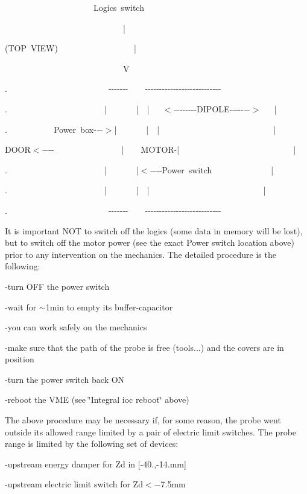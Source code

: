 \begin{lyxcode}
~~~~~~~~~~~~~~~~~~~~~Logics~switch~

~~~~~~~~~~~~~~~~~~~~~~~~~~~~|~

(TOP~VIEW)~~~~~~~~~~~~~~~~~~|~

~~~~~~~~~~~~~~~~~~~~~~~~~~~~V~~

.~~~~~~~~~~~~~~~~~~~~~~~~-{}-{}-{}-{}-{}-{}-~~~~-{}-{}-{}-{}-{}-{}-{}-{}-{}-{}-{}-{}-{}-{}-{}-{}-{}-{}-{}-{}-{}-{}-{}-{}-{}-{}-~

.~~~~~~~~~~~~~~~~~~~~~~~|~~~~~~~|~~|~~~$< -${}-{}-{}-{}-{}-{}-DIPOLE-{}-{}-{}-{}-{}$->$~~~|~

.~~~~~~~~~~~Power~box-{}$->$|~~~~~~~|~~|~~~~~~~~~~~~~~~~~~~~~~~~~~~|~

DOOR$< -${}-{}-~~~~~~~~~~~~~~~~|~~~~MOTOR-|~~~~~~~~~~~~~~~~~~~~~~~~~~~|~

.~~~~~~~~~~~~~~~~~~~~~~~|~~~~~~~|$< -${}-{}-Power~switch~~~~~~~~~~~~~~|~

.~~~~~~~~~~~~~~~~~~~~~~~|~~~~~~~|~~|~~~~~~~~~~~~~~~~~~~~~~~~~~~|~

.~~~~~~~~~~~~~~~~~~~~~~~~-{}-{}-{}-{}-{}-{}-~~~~-{}-{}-{}-{}-{}-{}-{}-{}-{}-{}-{}-{}-{}-{}-{}-{}-{}-{}-{}-{}-{}-{}-{}-{}-{}-{}-~
\end{lyxcode}


It is important NOT to switch off the logics (some data in memory will be lost),
but to switch off the motor power (see the exact Power switch location above)
prior to any intervention on the mechanics. The detailed procedure is the following: 

-turn OFF the power switch 

-wait for \( \sim  \)1min to empty its buffer-capacitor 

-you can work safely on the mechanics 

-make sure that the path of the probe is free (tools...) and the
 covers are in position 

-turn the power switch back ON 

-reboot the VME (see \char`\"{}Integral ioc reboot\char`\"{} above) 

The above procedure may be necessary if, for some reason, the probe went outside
its allowed range limited by a pair of electric limit switches. The probe range
is limited by the following set of devices: 

-upstream energy damper for Zd in {[}-40.,-14.mm{]} 

-upstream electric limit switch for Zd$<-$7.5mm 

